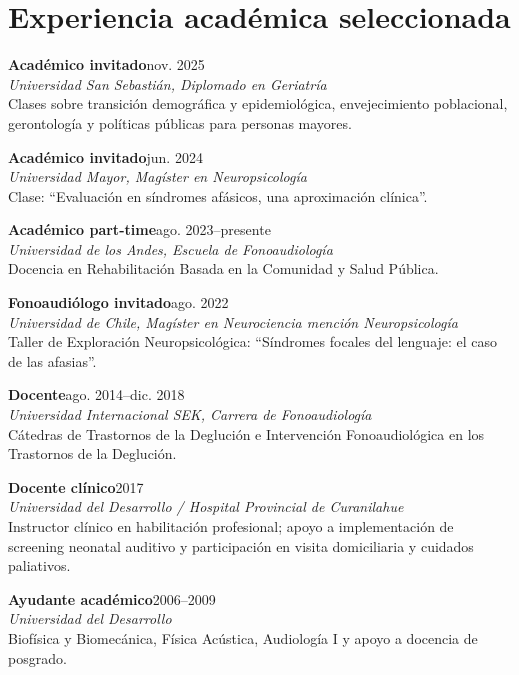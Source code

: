 \documentclass[10pt,a4paper]{article}
\newcommand{\entry}[4]{%
\textbf{#1}\hfill {\small #2}\\
{\emph{#3}}\\[-1pt]
#4\par\vspace{4pt}}
\begin{document}
\section*{Experiencia académica seleccionada}
\entry{Académico invitado}{nov. 2025}{Universidad San Sebastián, Diplomado en Geriatría}{Clases sobre transición demográfica y epidemiológica, envejecimiento poblacional, gerontología y políticas públicas para personas mayores.}
\entry{Académico invitado}{jun. 2024}{Universidad Mayor, Magíster en Neuropsicología}{Clase: ``Evaluación en síndromes afásicos, una aproximación clínica''.}
\entry{Académico part-time}{ago. 2023--presente}{Universidad de los Andes, Escuela de Fonoaudiología}{Docencia en Rehabilitación Basada en la Comunidad y Salud Pública.}
\entry{Fonoaudiólogo invitado}{ago. 2022}{Universidad de Chile, Magíster en Neurociencia mención Neuropsicología}{Taller de Exploración Neuropsicológica: ``Síndromes focales del lenguaje: el caso de las afasias''.}
\entry{Docente}{ago. 2014--dic. 2018}{Universidad Internacional SEK, Carrera de Fonoaudiología}{Cátedras de Trastornos de la Deglución e Intervención Fonoaudiológica en los Trastornos de la Deglución.}
\entry{Docente clínico}{2017}{Universidad del Desarrollo / Hospital Provincial de Curanilahue}{Instructor clínico en habilitación profesional; apoyo a implementación de screening neonatal auditivo y participación en visita domiciliaria y cuidados paliativos.}
\entry{Ayudante académico}{2006--2009}{Universidad del Desarrollo}{Biofísica y Biomecánica, Física Acústica, Audiología I y apoyo a docencia de posgrado.}
\end{document}

